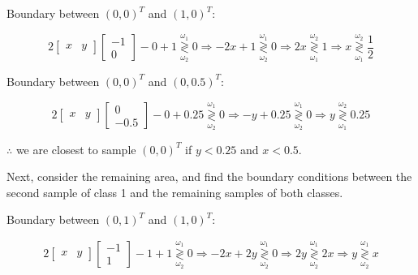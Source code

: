 \documentclass[fleqn]{article}
\begin{document}
\begin{enumerate}
		Boundary between $(0,0)^T$ and $(1,0)^T$:
		
		\begin{equation*}
			2 \begin{bmatrix} x & y \end{bmatrix} \begin{bmatrix}-1\\ 0\end{bmatrix} - 0 + 1 \overset{\omega_1}{\underset{\omega_2}{\gtrless}} 0 \Rightarrow -2x + 1 \overset{\omega_1}{\underset{\omega_2}{\gtrless}} 0 \Rightarrow 2x \overset{\omega_2}{\underset{\omega_1}{\gtrless}} 1 \Rightarrow x \overset{\omega_2}{\underset{\omega_1}{\gtrless}} \frac{1}{2}			
		\end{equation*}
		
		Boundary between $(0,0)^T$ and $(0,0.5)^T$:
		
		\begin{equation*}
			2 \begin{bmatrix} x & y \end{bmatrix} \begin{bmatrix}0\\ -0.5\end{bmatrix} - 0 + 0.25 \overset{\omega_1}{\underset{\omega_2}{\gtrless}} 0 \Rightarrow -y + 0.25 \overset{\omega_1}{\underset{\omega_2}{\gtrless}} 0 \Rightarrow y \overset{\omega_2}{\underset{\omega_1}{\gtrless}} 0.25		
		\end{equation*}
		
		$\therefore$ we are closest to sample $(0,0)^T$ if $y < 0.25$ and $x < 0.5$.
		
		Next, consider the remaining area, and find the boundary conditions between the second sample of class 1 and the remaining samples of both classes.
		
		Boundary between $(0,1)^T$ and $(1,0)^T$:
		
		\begin{equation*}
			2 \begin{bmatrix} x & y \end{bmatrix} \begin{bmatrix}-1\\ 1\end{bmatrix} - 1 + 1 \overset{\omega_1}{\underset{\omega_2}{\gtrless}} 0 \Rightarrow -2x + 2y \overset{\omega_1}{\underset{\omega_2}{\gtrless}} 0 \Rightarrow 2y \overset{\omega_1}{\underset{\omega_2}{\gtrless}} 2x \Rightarrow y \overset{\omega_1}{\underset{\omega_2}{\gtrless}} x		
		\end{equation*}
		

\end{enumerate}
\end{document}
